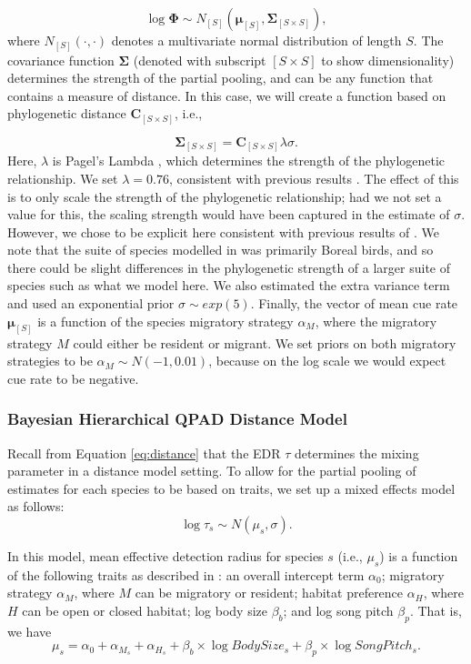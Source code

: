 \documentclass[12pt]{article}
\begin{document}
$$\log \mathbf{\Phi} \sim N_{[S]}\left( \mathbf{\mu}_{[S]}, \mathbf{\Sigma}_{[S \times S]} \right),$$
where $N_{[S]}(\cdot,\cdot)$ denotes a multivariate normal distribution of length $S$.
The covariance function $\mathbf{\Sigma}$ (denoted with subscript $[S \times S]$ to show dimensionality) determines the strength of the partial pooling, and can be any function that contains a measure of distance. 
In this case, we will create a function based on phylogenetic distance $\mathbf{C}_{[S \times S]}$, i.e.,

$$\mathbf{\Sigma}_{[S \times S]} = \mathbf{C}_{[S \times S]}\lambda\sigma.$$
Here, $\lambda$ is Pagel's Lambda \citep{pagel_inferring_1999}, which determines the strength of the phylogenetic relationship. 
We set $\lambda = 0.76$, consistent with previous results \cite{solymos_phylogeny_2018}. 
The effect of this is to only scale the strength of the phylogenetic relationship; had we not set a value for this, the scaling strength would have been captured in the estimate of $\sigma$. 
However, we chose to be explicit here consistent with previous results of \cite{solymos_phylogeny_2018}.
We note that the suite of species modelled in \citet{solymos_evaluating_2018} was primarily Boreal birds, and so there could be slight differences in the phylogenetic strength of a larger suite of species such as what we model here.
We also estimated the extra variance term and used an exponential prior $\sigma \sim exp(5)$.
Finally, the vector of mean cue rate $\mathbf{\mu}_{[S]}$ is a function of the species migratory strategy $\alpha_M$, where the migratory strategy $M$ could either be resident or migrant. 
We set priors on both migratory strategies to be $\alpha_M \sim N(-1, 0.01)$, because on the log scale we would expect cue rate to be negative. 

\subsubsection{Bayesian Hierarchical QPAD Distance Model}\label{section-distance-models}

\par \par Recall from Equation \ref{eq:distance} that the EDR $\tau$ determines the mixing parameter in a distance model setting.
To allow for the partial pooling of estimates for each species to be based on traits, we set up a mixed effects model as follows:
$$\log \tau_s \sim N(\mu_s, \sigma).$$

\par In this model, mean effective detection radius for species $s$ (i.e., $\mu_s$) is a function of the following traits as described in \cite{solymos_phylogeny_2018}: an overall intercept term $\alpha_0$; migratory strategy $\alpha_M$, where $M$ can be migratory or resident; habitat preference $\alpha_H$, where $H$ can be open or closed habitat; log body size $\beta_b$; and log song pitch $\beta_p$. 
That is, we have
$$ \mu_s = \alpha_0 + \alpha_{M_s} + \alpha_{H_s} + \beta_b \times \log BodySize_s + \beta_p \times \log SongPitch_s.$$
\end{document}
